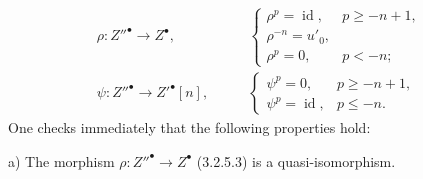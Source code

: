 \begin{equation}
\begin{aligned}
\rho\colon Z''^\bullet\longrightarrow Z^\bullet,
&\qquad
\begin{cases}
\rho^p=\operatorname{id},&p\geq -n+1,\\
\rho^{-n}=u'_0,&\\
\rho^p=0,&p<-n;
\end{cases}\\[3pt]
\psi\colon Z''^\bullet\longrightarrow {Z'}^\bullet[n],
&\qquad
\begin{cases}
\psi^p=0,&p\geq -n+1,\\
\psi^p=\operatorname{id},&p\leq -n.
\end{cases}
\end{aligned}
\tag{3.2.5.3}
\end{equation}
One checks immediately that the following properties hold:

\noindent a) The morphism
$\rho\colon Z''^\bullet\longrightarrow Z^\bullet$ (3.2.5.3) is a
quasi-isomorphism.
\endgroup
